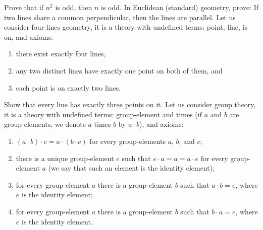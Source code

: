 \begin{chapterendexercises}
  \exercise[recommended] Prove that if $n^2$ is odd, then $n$ is odd.
  \exercise  In Euclidean (standard) geometry, prove: If two lines share a
    common perpendicular, then the lines are parallel.
  \exercise[recommended] Let us consider four-lines geometry, it is a theory with
    undefined terms: point, line, is on, and axioms:
    \begin{enumerate}
        \item there exist exactly four lines,
        \item any two distinct lines have exactly one point on both of them, and
        \item each point is on exactly two lines.
    \end{enumerate}

    Show that every line has exactly three points on it.
  \exercise
    Let us consider group theory, it is a theory with undefined
    terms: group-element and times (if $a$ and $b$ are group elements,
    we denote $a$ times $b$ by $a \cdot b$), and axioms:
    \begin{enumerate}
      \item $(a \cdot b) \cdot c = a \cdot (b \cdot c)$
        for every group-elements $a$, $b$, and $c$;
      \item there is a unique group-element $e$ such that
        $e \cdot a = a = a \cdot e$ for every group-element $a$
        (we say that such an element is the identity element);
      \item for every group-element $a$ there is a group-element $b$
        such that $a \cdot b = e$, where $e$ is the identity element;
      \item for every group-element $a$ there is a group-element $b$
        such that $b \cdot a = e$, where $e$ is the identity element.
    \end{enumerate}


\end{chapterendexercises}

